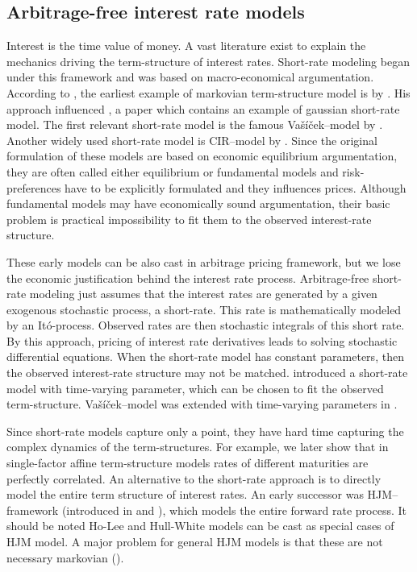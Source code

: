 \subsection{Arbitrage-free interest rate models}

Interest is the time value of money. A vast literature exist to explain the mechanics driving the term-structure of interest rates. Short-rate modeling began under this framework and was based on macro-economical argumentation. According to \textcite[p. 161]{duffie2010dynamic}, the earliest example of markovian term-structure model is by \textcite{pye1966markov}. His approach influenced \textcite{merton1974pricing}, a paper which contains an example of gaussian short-rate model. The first relevant short-rate model is the famous Va\v{s}\'{i}\v{c}ek--model by \textcite{vasicek1977equilibrium}. Another widely used short-rate model is CIR--model by \textcite{coxingersollross1985theory}. Since the original formulation of these models are based on economic equilibrium argumentation, they are often called either equilibrium or fundamental models and risk-preferences have to be explicitly formulated and they influences prices. Although fundamental models may have economically sound argumentation, their basic problem is practical impossibility to fit them to the observed interest-rate structure.

These early models can be also cast in arbitrage pricing framework, but we lose the economic justification behind the interest rate process. Arbitrage-free short-rate modeling just assumes that the interest rates are generated by a given exogenous stochastic process, a short-rate. This rate is mathematically modeled by an It\'{o}-process. Observed rates are then stochastic integrals of this short rate. By this approach, pricing of interest rate derivatives leads to solving stochastic differential equations. When the short-rate model has constant parameters, then the observed interest-rate structure may not be matched. \textcite{ho1986term} introduced a short-rate model with time-varying parameter, which can be chosen to fit the observed term-structure. Va\v{s}\'{i}\v{c}ek--model was extended with time-varying parameters in  \textcite{hull1990pricing}.

Since short-rate models capture only a point, they have hard time capturing the complex dynamics of the term-structures. For example, we later show that in single-factor affine term-structure models rates of different maturities are perfectly correlated. An alternative to the short-rate approach is to directly model the entire term structure of interest rates. An early successor was HJM--framework  (introduced in \cite{HJM1990bondpricing} and \cite{HJM1992bondpricing}), which models the entire forward rate process. It should be noted Ho-Lee and Hull-White models can be cast as special cases of HJM model. A major problem for general HJM models is that these are not necessary markovian (\cite{ritchken1995volatility}).

